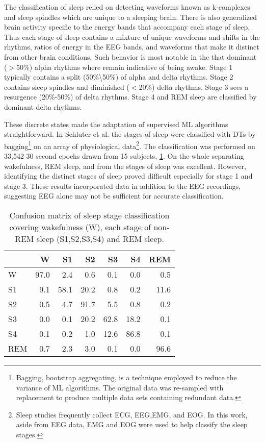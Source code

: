 The classification of sleep relied on detecting waveforms known as k-complexes and sleep spindles which are unique to a sleeping brain. There is also generalized brain activity specific to the energy bands that accompany each stage of sleep\cite{Silber2007}. Thus each stage of sleep contains a mixture of unique waveforms and shifts in the rhythms, ratios of energy in the \ac{EEG} bands, and waveforms that make it distinct from other brain conditions. Such behavior is most notable in the that dominant ($>$50\%) alpha rhythms where remain indicative of being awake. Stage 1 typically contains a split (50\%\textbackslash50\%) of alpha and delta rhythms. Stage 2 contains sleep spindles and diminished ($<$20\%) delta rhythms. Stage 3 sees a resurgence (20\%-50\%) of delta rhythms. Stage 4 and \ac{REM} sleep are classified by dominant delta rhythms.

These discrete states made the adaptation of supervised \ac{ML} algorithms straightforward. In Schluter et al.\cite{Schluter2012} the stages of sleep were classified with \acp{DT} by bagging\footnote{Bagging, bootstrap aggregating, is a technique employed to reduce the variance of \ac{ML} algorithms. The original data was re-sampled with replacement to produce multiple data sets containing redundant data.} on an array of physiological data\footnote{Sleep studies frequently collect \ac{ECG}, \ac{EEG},\ac{EMG}, and \ac{EOG}. In this work, aside from \ac{EEG} data, \ac{EMG} and \ac{EOG} were used to help classify the sleep stages.}. The classification was performed on 33,542 30 second epochs drawn from 15 subjects, \cref{tab:sleep_conf}. On the whole separating wakefulness, \ac{REM} sleep, and from the stages of sleep was excellent. However, identifying the distinct stages of sleep proved difficult especially for stage 1 and stage 3. These results incorporated data in addition to the \ac{EEG} recordings, suggesting \ac{EEG} alone may not be sufficient for accurate classification.

\begin{table}[ht]
\caption[Confusion matrix of sleep stage classification]{Confusion matrix of sleep stage classification covering wakefulness (W), each stage of non-REM sleep (S1,S2,S3,S4) and REM sleep.}
\centering
\begin{tabular}{ l | r r r r r r }
\toprule
& W & S1 & S2 & S3 & S4 & REM \\
\midrule
W 	& 97.0 	& 2.4 	& 0.6 	& 0.1 	& 0.0 	& 0.5 \\
S1 	& 9.1 	& 58.1 	& 20.2 	& 0.8 	& 0.2 	& 11.6 \\
S2 	& 0.5 	& 4.7 	& 91.7 	& 5.5 	& 0.8 	& 0.2 \\
S3 	& 0.0 	& 0.1 	& 20.2 	& 62.8 	& 18.2 	& 0.1 \\
S4 	& 0.1 	& 0.2 	& 1.0 	& 12.6 	& 86.8 	& 0.1 \\
REM 	& 0.7 	& 2.3 	& 3.0 	& 0.1 	& 0.0 	& 96.6 \\
\bottomrule
\end{tabular}
\label{tab:sleep_conf}
\end{table}

